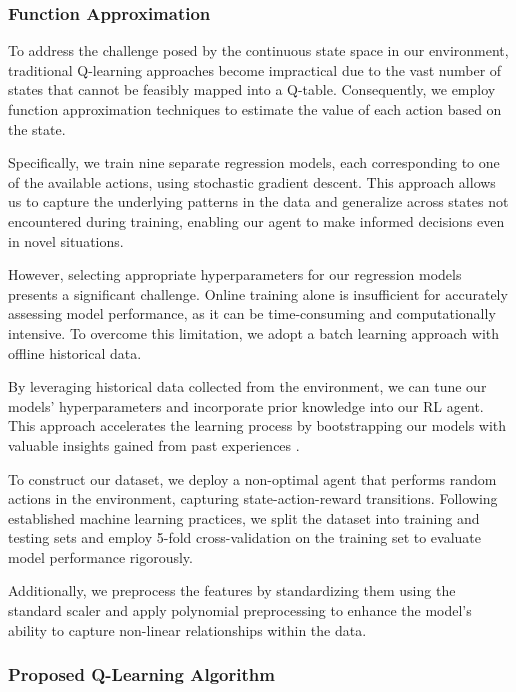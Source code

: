 \subsubsection{Function Approximation}

To address the challenge posed by the continuous state space in our environment, traditional Q-learning approaches become impractical due to the vast number of states that cannot be feasibly mapped into a Q-table. Consequently, we employ function approximation techniques to estimate the value of each action based on the state.

Specifically, we train nine separate regression models, each corresponding to one of the available actions, using stochastic gradient descent. This approach allows us to capture the underlying patterns in the data and generalize across states not encountered during training, enabling our agent to make informed decisions even in novel situations.

However, selecting appropriate hyperparameters for our regression models presents a significant challenge. Online training alone is insufficient for accurately assessing model performance, as it can be time-consuming and computationally intensive. To overcome this limitation, we adopt a batch learning approach with offline historical data.

By leveraging historical data collected from the environment, we can tune our models' hyperparameters and incorporate prior knowledge into our RL agent. This approach accelerates the learning process by bootstrapping our models with valuable insights gained from past experiences \cite{cano2017curator,vukosi2015improved}.

To construct our dataset, we deploy a non-optimal agent that performs random actions in the environment, capturing state-action-reward transitions. Following established machine learning practices, we split the dataset into training and testing sets and employ 5-fold cross-validation on the training set to evaluate model performance rigorously.

Additionally, we preprocess the features by standardizing them using the standard scaler and apply polynomial preprocessing to enhance the model's ability to capture non-linear relationships within the data.


\subsubsection{Proposed Q-Learning Algorithm}

